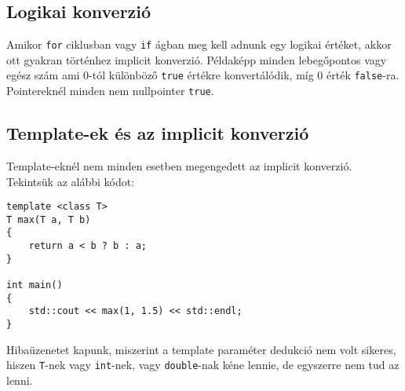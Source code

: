 \documentclass[a4paper,11.5pt,table]{article}
\begin{document}
	\subsection{Logikai konverzió}
	Amikor \texttt{for} ciklusban vagy \texttt{if} ágban meg kell adnunk egy logikai értéket, akkor ott gyakran történhez implicit konverzió. Példaképp minden lebegőpontos vagy egész szám ami 0-tól különböző \texttt{true} értékre konvertálódik, míg 0 érték \texttt{false}-ra. Pointereknél minden nem nullpointer \texttt{true}.
	\subsection{Template-ek és az implicit konverzió}
	Template-eknél nem minden esetben megengedett az implicit konverzió. Tekintsük az alábbi kódot:
	\begin{lstlisting}
template <class T>
T max(T a, T b)
{
	return a < b ? b : a;
}

int main()
{
	std::cout << max(1, 1.5) << std::endl;
}
	\end{lstlisting}
	Hibaüzenetet kapunk, miszerint a template paraméter dedukció nem volt sikeres, hiszen \texttt{T}-nek vagy \texttt{int}-nek, vagy \texttt{double}-nak kéne lennie, de egyszerre nem tud az lenni.
\end{document}
